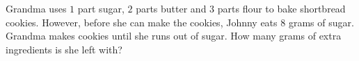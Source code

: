 Grandma uses $1$ part sugar, $2$ parts butter and $3$ parts flour to bake shortbread cookies. However, before she can make the cookies, Johnny eats $8$ grams of sugar. Grandma makes cookies until she runs out of sugar. How many grams of extra ingredients is she left with?
